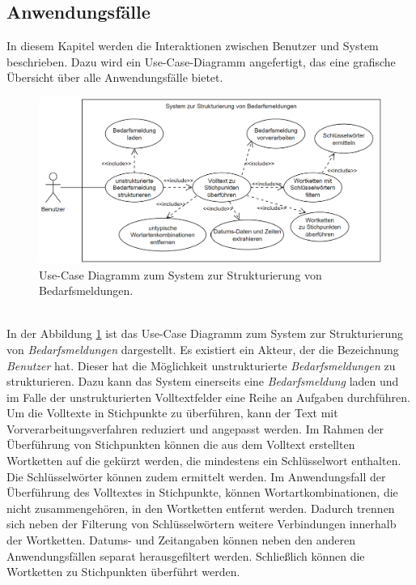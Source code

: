 \subsection{Anwendungsfälle}
\label{sec:usecase}
In diesem Kapitel werden die Interaktionen zwischen Benutzer und System beschrieben. Dazu wird ein Use-Case-Diagramm angefertigt, das eine grafische Übersicht über alle Anwendungsfälle bietet.
\begin{figure}[H]
	\centering  
	\includegraphics[width=\linewidth]{Abbildungen/use-case.png}
	\caption{Use-Case Diagramm zum System zur Strukturierung von Bedarfsmeldungen.}
	\label{fig:usecasediagrammwirklich}
\end{figure}\mbox{} \\
In der Abbildung \ref{fig:usecasediagrammwirklich} ist das Use-Case Diagramm zum System zur Strukturierung von \emph{Bedarfsmeldungen} dargestellt. Es existiert ein Akteur, der die Bezeichnung \emph{Benutzer} hat. Dieser hat die Möglichkeit unstrukturierte \emph{Bedarfsmeldungen} zu strukturieren. Dazu kann das System einerseits eine \emph{Bedarfsmeldung} laden und im Falle der unstrukturierten Volltextfelder eine Reihe an Aufgaben durchführen. Um die Volltexte in Stichpunkte zu überführen, kann der Text mit Vorverarbeitungsverfahren reduziert und angepasst werden. Im Rahmen der Überführung von Stichpunkten können die aus dem Volltext erstellten Wortketten auf die gekürzt werden, die mindestens ein Schlüsselwort enthalten. Die Schlüsselwörter können zudem ermittelt werden. Im Anwendungsfall der Überführung des Volltextes in Stichpunkte, können Wortartkombinationen, die nicht zusammengehören, in den Wortketten entfernt werden. Dadurch trennen sich neben der Filterung von Schlüsselwörtern weitere Verbindungen innerhalb der Wortketten. Datums- und Zeitangaben können neben den anderen Anwendungsfällen separat herausgefiltert werden. Schließlich können die Wortketten zu Stichpunkten überführt werden.
